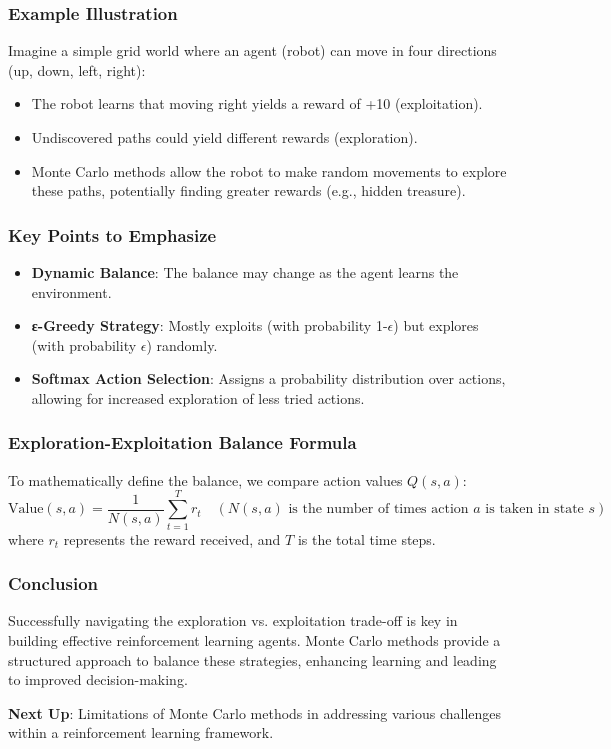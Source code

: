 \documentclass[aspectratio=169]{beamer}
\begin{document}
\begin{frame}[fragile]
    \frametitle{Example Illustration}
    Imagine a simple grid world where an agent (robot) can move in four directions (up, down, left, right):
    \begin{itemize}
        \item The robot learns that moving right yields a reward of +10 (exploitation).
        \item Undiscovered paths could yield different rewards (exploration).
        \item Monte Carlo methods allow the robot to make random movements to explore these paths, potentially finding greater rewards (e.g., hidden treasure).
    \end{itemize}
\end{frame}

\begin{frame}[fragile]
    \frametitle{Key Points to Emphasize}
    \begin{itemize}
        \item \textbf{Dynamic Balance}: The balance may change as the agent learns the environment.
        \item \textbf{ε-Greedy Strategy}: Mostly exploits (with probability 1-$\epsilon$) but explores (with probability $\epsilon$) randomly.
        \item \textbf{Softmax Action Selection}: Assigns a probability distribution over actions, allowing for increased exploration of less tried actions.
    \end{itemize}
\end{frame}

\begin{frame}[fragile]
    \frametitle{Exploration-Exploitation Balance Formula}
    To mathematically define the balance, we compare action values \( Q(s, a) \):
    \begin{equation}
        \text{Value}(s, a) = \frac{1}{N(s, a)} \sum_{t=1}^{T} r_t \quad (N(s, a) \text{ is the number of times action } a \text{ is taken in state } s)
    \end{equation}
    where \( r_t \) represents the reward received, and \( T \) is the total time steps.
\end{frame}

\begin{frame}[fragile]
    \frametitle{Conclusion}
    Successfully navigating the exploration vs. exploitation trade-off is key in building effective reinforcement learning agents. 
    Monte Carlo methods provide a structured approach to balance these strategies, enhancing learning and leading to improved decision-making.
    
    \textbf{Next Up}: Limitations of Monte Carlo methods in addressing various challenges within a reinforcement learning framework.
\end{frame}
\end{document}
